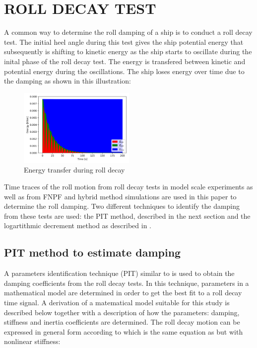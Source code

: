 \section*{ROLL DECAY TEST}\label{roll-decay-test}

    A common way to determine the roll damping of a ship is to conduct a
roll decay test. The initial heel angle during this test gives the ship
potential energy that subsequently is shifting to kinetic energy as the
ship starts to oscillate during the inital phase of the roll decay test.
The energy is transfered between kinetic and potential energy during the
oscillations. The ship loses energy over time due to the damping as
shown in this illustration:
 
            
    
    \begin{figure}[H]
        \begin{center}\includegraphics[width = 0.5\textwidth]{figures/energy.png}\end{center}
        \vspace{-1cm}
        \caption{Energy transfer during roll decay}
        \label{fig:energy}
    \end{figure}
    

    Time traces of the roll motion from roll decay tests in model scale
experiments as well as from FNPF and hybrid method simulations are used
in this paper to determine the roll damping. Two different techniques to
identify the damping from these tests are used: the PIT method,
described in the next section and the logartithmic decrement method as
described in \cite{7505983/BYNJ8CFG}.
    \subsection*{PIT method to estimate
damping}\label{pit-method-to-estimate-damping}

    A parameters identification technique (PIT) similar to
\cite{7505983/EXYJELCU} is used to obtain the damping coefficients from
the roll decay tests. In this technique, parameters in a mathematical
model are determined in order to get the best fit to a roll decay time
signal. A derivation of a matematical model suitable for this study is
described below together with a description of how the parameters:
damping, stiffness and inertia coefficients are determined. The roll
decay motion can be expressed in general form according to
\cite{7505983/KL7A3RIV} which is the same equation as
\cite{7505983/FB64RGPF} but with nonlinear stiffness:
 
